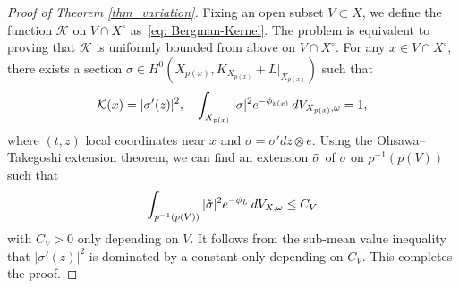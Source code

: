 \documentclass[a4paper, 11pt]{amsart}
\theoremstyle{plain}
\numberwithin{equation}{section} %
\numberwithin{figure}{section} %
\theoremstyle{plain}
\theoremstyle{plain}
\theoremstyle{plain}
\theoremstyle{plain}
\theoremstyle{remark}
\newtheorem{remark}[theorem]{Remark}
\theoremstyle{definition}
\theoremstyle{definition}
\newcommand{\K}{\mathcal{K}}
\begin{document}
\begin{proof}[Proof of Theorem \ref{thm_variation}]
Fixing an open subset $V\subset X$, we define
the function $\K$ on $V\cap X^\circ $ as~\eqref{eq: Bergman-Kernel}.   
The problem is equivalent to proving that $\K$ is uniformly bounded from above on $V\cap X^\circ$. For any $x\in V\cap X^\circ$, there exists a section $\sigma\in H^0(X_{p(x)}, K_{X_{p(x)}}+L|_{X_{p(x)}})$ such that
\[ \K(x)=|\sigma'(z)|^2,\quad\int_{X_{p(x)}}|\sigma|^2 e^{-\phi_{p(x)}}\, {\rm d}V_{X_{p(x)},\omega}=1,\] 
where $(t,z)$ local coordinates near $x$ and $\sigma=\sigma' dz\otimes e$.
Using the Ohsawa--Takegoshi extension theorem, we can find an extension $\Tilde{\sigma}$ of $\sigma$ on $p^{-1}(p(V))$ such that
\[ \int_{p^{-1}(p(V))}|\Tilde{\sigma}|^2 e^{-\phi_L}\, {\rm d}V_{X,\omega}\leq C_V \]
with $C_V>0$ only depending on $V$. It follows from the sub-mean value inequality that $|\sigma'    (z)|^2$ is dominated by a constant only depending on $C_V$. 
This completes the proof.
 \end{proof}
 
\end{document}
